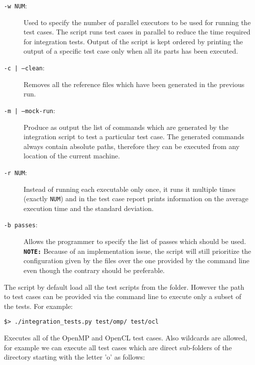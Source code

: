 \begin{description}

	\item [{\tt -w NUM}:] Used to specify the number of parallel executors to be
		used for running the test cases. The script runs test cases in parallel to
		reduce the time required for integration tests. Output of the script is
		kept ordered by printing the output of a specific test case only when all
		its parts has been executed. 

	\item [{\tt -c | --clean}:] Removes all the reference files which have been
		generated in the previous run. 

	\item[{\tt -m | --mock-run}:] Produce as output the list of commands which
		are generated by the integration script to test a particular test case.
		The generated commands always contain absolute paths, therefore they can
		be executed from any location of the current machine. 

	\item[{\tt -r NUM}:] Instead of running each executable only once, it runs it
		multiple times (exactly {\tt NUM}) and in the test case report prints
		information on the average execution time and the standard deviation. 

	\item[{\tt -b passes}:] Allows the programmer to specify the list of passes
		which should be used.  \\
		{\bf\tt NOTE:} Because of an implementation issue, the script will still
		prioritize the configuration given by the  files over the one
		provided by the command line even though the contrary should be
		preferable.

\end{description}

The script by default load all the test scripts from the  folder.
However the path to test cases can be provided via the command line to execute
only a subset of the tests. For example:

\begin{verbatim}
$> ./integration_tests.py test/omp/ test/ocl
\end{verbatim}

Executes all of the OpenMP and OpenCL test cases. Also wildcards are allowed,
for example we can execute all test cases which are direct sub-folders of the
 directory starting with the letter 'o' as follows:

